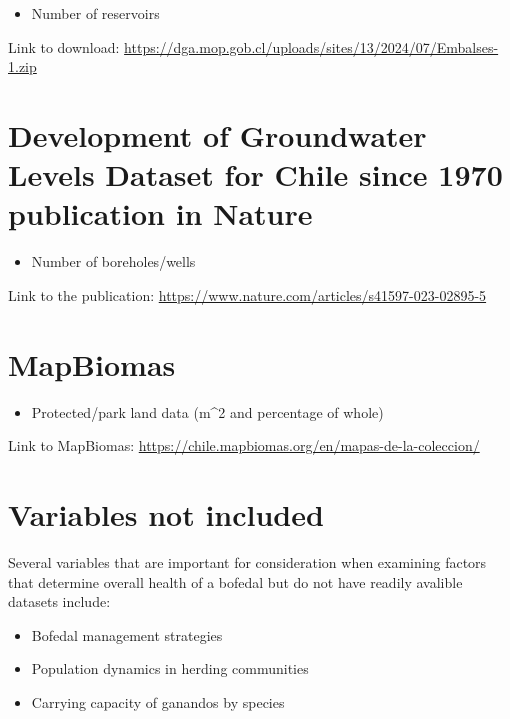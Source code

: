 \documentclass[
  letterpaper,
  DIV=11,
  numbers=noendperiod]{scrreprt}
\providecommand{\tightlist}{%
  \setlength{\itemsep}{0pt}\setlength{\parskip}{0pt}}
\begin{document}
\begin{itemize}
\tightlist
\item
  Number of reservoirs
\end{itemize}

Link to download:
\href{URL}{https://dga.mop.gob.cl/uploads/sites/13/2024/07/Embalses-1.zip}

\section{Development of Groundwater Levels Dataset for Chile since 1970
publication in
Nature}\label{development-of-groundwater-levels-dataset-for-chile-since-1970-publication-in-nature}

\begin{itemize}
\tightlist
\item
  Number of boreholes/wells
\end{itemize}

Link to the publication:
\href{URL}{https://www.nature.com/articles/s41597-023-02895-5}

\section{MapBiomas}\label{mapbiomas}

\begin{itemize}
\tightlist
\item
  Protected/park land data (m\^{}2 and percentage of whole)
\end{itemize}

Link to MapBiomas:
\href{URL}{https://chile.mapbiomas.org/en/mapas-de-la-coleccion/}

\section{Variables not included}\label{variables-not-included}

Several variables that are important for consideration when examining
factors that determine overall health of a bofedal but do not have
readily avalible datasets include:

\begin{itemize}
\tightlist
\item
  Bofedal management strategies
\item
  Population dynamics in herding communities
\item
  Carrying capacity of ganandos by species
\end{itemize}
\end{document}
